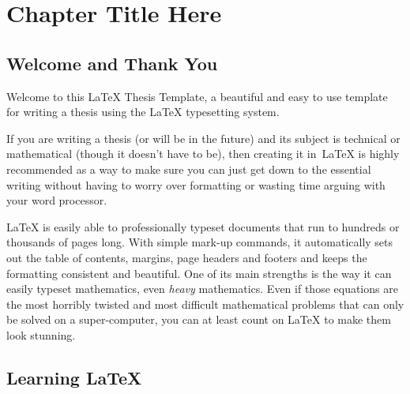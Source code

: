 
\chapter{Chapter Title Here} %

\label{Chaptertest} %


\newcommand{\keyword}[1]{\textbf{#1}}
\newcommand{\tabhead}[1]{\textbf{#1}}
\newcommand{\code}[1]{\texttt{#1}}
\newcommand{\file}[1]{\texttt{\bfseries#1}}
\newcommand{\option}[1]{\texttt{\itshape#1}}


\section{Welcome and Thank You}
Welcome to this \LaTeX{} Thesis Template, a beautiful and easy to use template for writing a thesis using the \LaTeX{} typesetting system.

If you are writing a thesis (or will be in the future) and its subject is technical or mathematical (though it doesn't have to be), then creating it in~\LaTeX{} is highly recommended as a way to make sure you can just get down to the essential writing without having to worry over formatting or wasting time arguing with your word processor.

\LaTeX{} is easily able to professionally typeset documents that run to hundreds or thousands of pages long. With simple mark-up commands, it automatically sets out the table of contents, margins, page headers and footers and keeps the formatting consistent and beautiful. One of its main strengths is the way it can easily typeset mathematics, even \emph{heavy} mathematics. Even if those equations are the most horribly twisted and most difficult mathematical problems that can only be solved on a super-computer, you can at least count on \LaTeX{} to make them look stunning.


\section{Learning \LaTeX{}}

